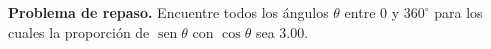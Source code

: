 \item \textbf{Problema de repaso.} Encuentre todos los ángulos $\theta$ entre $0$ y $360^\circ$ para los cuales la proporción de $\operatorname{sen} \theta$ con $\cos \theta$ sea $3.00$.
